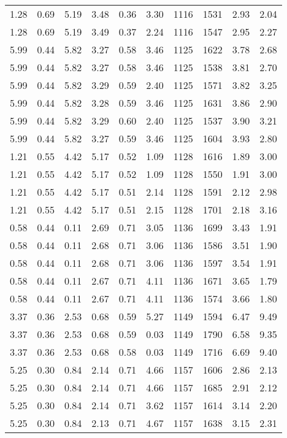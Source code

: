 \begin{longtable}{rrrrrrrrrr}
1.28	&	0.69	&	5.19	&	3.48	&	0.36	&	3.30	&	1116	&	1531	&	2.93	&	2.04	\\
1.28	&	0.69	&	5.19	&	3.49	&	0.37	&	2.24	&	1116	&	1547	&	2.95	&	2.27	\\
5.99	&	0.44	&	5.82	&	3.27	&	0.58	&	3.46	&	1125	&	1622	&	3.78	&	2.68	\\
5.99	&	0.44	&	5.82	&	3.27	&	0.58	&	3.46	&	1125	&	1538	&	3.81	&	2.70	\\
5.99	&	0.44	&	5.82	&	3.29	&	0.59	&	2.40	&	1125	&	1571	&	3.82	&	3.25	\\
5.99	&	0.44	&	5.82	&	3.28	&	0.59	&	3.46	&	1125	&	1631	&	3.86	&	2.90	\\
5.99	&	0.44	&	5.82	&	3.29	&	0.60	&	2.40	&	1125	&	1537	&	3.90	&	3.21	\\
5.99	&	0.44	&	5.82	&	3.27	&	0.59	&	3.46	&	1125	&	1604	&	3.93	&	2.80	\\
1.21	&	0.55	&	4.42	&	5.17	&	0.52	&	1.09	&	1128	&	1616	&	1.89	&	3.00	\\
1.21	&	0.55	&	4.42	&	5.17	&	0.52	&	1.09	&	1128	&	1550	&	1.91	&	3.00	\\
1.21	&	0.55	&	4.42	&	5.17	&	0.51	&	2.14	&	1128	&	1591	&	2.12	&	2.98	\\
1.21	&	0.55	&	4.42	&	5.17	&	0.51	&	2.15	&	1128	&	1701	&	2.18	&	3.16	\\
0.58	&	0.44	&	0.11	&	2.69	&	0.71	&	3.05	&	1136	&	1699	&	3.43	&	1.91	\\
0.58	&	0.44	&	0.11	&	2.68	&	0.71	&	3.06	&	1136	&	1586	&	3.51	&	1.90	\\
0.58	&	0.44	&	0.11	&	2.68	&	0.71	&	3.06	&	1136	&	1597	&	3.54	&	1.91	\\
0.58	&	0.44	&	0.11	&	2.67	&	0.71	&	4.11	&	1136	&	1671	&	3.65	&	1.79	\\
0.58	&	0.44	&	0.11	&	2.67	&	0.71	&	4.11	&	1136	&	1574	&	3.66	&	1.80	\\
3.37	&	0.36	&	2.53	&	0.68	&	0.59	&	5.27	&	1149	&	1594	&	6.47	&	9.49	\\
3.37	&	0.36	&	2.53	&	0.68	&	0.59	&	0.03	&	1149	&	1790	&	6.58	&	9.35	\\
3.37	&	0.36	&	2.53	&	0.68	&	0.58	&	0.03	&	1149	&	1716	&	6.69	&	9.40	\\
5.25	&	0.30	&	0.84	&	2.14	&	0.71	&	4.66	&	1157	&	1606	&	2.86	&	2.13	\\
5.25	&	0.30	&	0.84	&	2.14	&	0.71	&	4.66	&	1157	&	1685	&	2.91	&	2.12	\\
5.25	&	0.30	&	0.84	&	2.14	&	0.71	&	3.62	&	1157	&	1614	&	3.14	&	2.20	\\
5.25	&	0.30	&	0.84	&	2.13	&	0.71	&	4.67	&	1157	&	1638	&	3.15	&	2.31	\\

\end{longtable}
